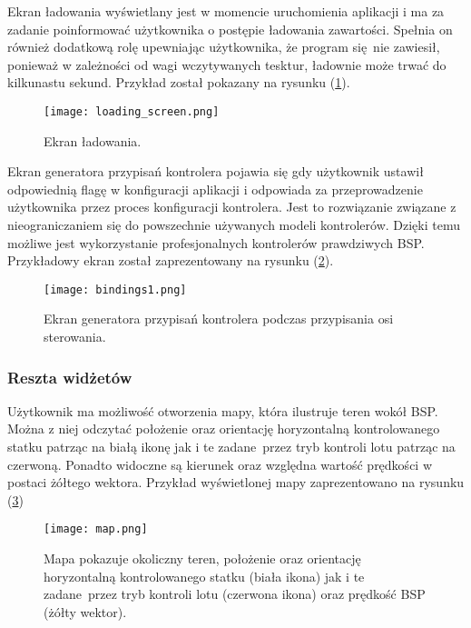 Ekran ładowania wyświetlany jest w momencie uruchomienia aplikacji i ma za zadanie poinformować użytkownika o postępie ładowania zawartości. Spełnia on również dodatkową rolę upewniając użytkownika, że program się nie zawiesił, ponieważ w zależności od wagi wczytywanych tesktur, ładownie może trwać do kilkunastu sekund. Przykład został pokazany na rysunku (\ref{gui_loading}).

\begin{figure}[!h]
	\centering
	\texttt{[image: loading\_screen.png]}
	\caption{Ekran ładowania.}
	\label{gui_loading}
\end{figure}

Ekran generatora przypisań kontrolera pojawia się gdy użytkownik ustawił odpowiednią flagę w konfiguracji aplikacji i odpowiada za przeprowadzenie użytkownika przez proces konfiguracji kontrolera. Jest to rozwiązanie związane z nieograniczaniem się do powszechnie używanych modeli kontrolerów. Dzięki temu możliwe jest wykorzystanie profesjonalnych kontrolerów prawdziwych BSP. Przykładowy ekran został zaprezentowany na rysunku (\ref{gui_bindings1}).

\begin{figure}[!h]
	\centering
	\texttt{[image: bindings1.png]}
	\caption{Ekran generatora przypisań kontrolera podczas przypisania osi sterowania.}
	\label{gui_bindings1}
\end{figure}

\subsubsection{Reszta widżetów}

Użytkownik ma możliwość otworzenia mapy, która ilustruje teren wokół BSP. Można z niej odczytać położenie oraz orientację horyzontalną kontrolowanego statku patrząc na białą ikonę jak i te zadane przez tryb kontroli lotu patrząc na czerwoną. Ponadto widoczne są kierunek oraz względna wartość prędkości w postaci żółtego wektora. Przykład wyświetlonej mapy zaprezentowano na rysunku (\ref{map})
\\

\begin{figure}[h]
	\centering
	\texttt{[image: map.png]}
	\caption{Mapa pokazuje okoliczny teren, położenie oraz orientację horyzontalną kontrolowanego statku (biała ikona) jak i te zadane przez tryb kontroli lotu (czerwona ikona) oraz prędkość BSP (żółty wektor).}
	\label{map}
\end{figure}


